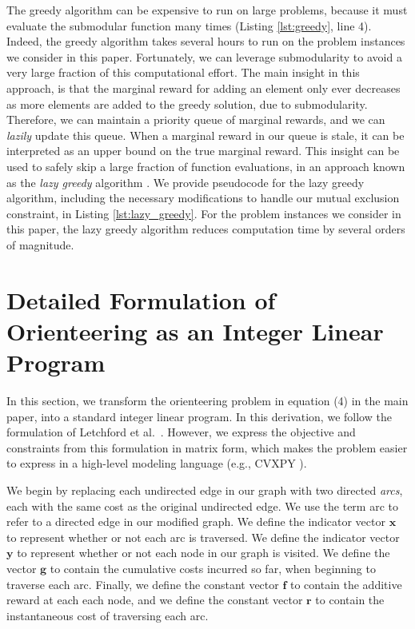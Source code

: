 The greedy algorithm can be expensive to run on large problems, because it must evaluate the submodular function many times (Listing \ref{lst:greedy}, line 4).
Indeed, the greedy algorithm takes several hours to run on the problem instances we consider in this paper. 
Fortunately, we can leverage submodularity to avoid a very large fraction of this computational effort.
The main insight in this approach, is that the marginal reward for adding an element only ever decreases as more elements are added to the greedy solution, due to submodularity.
Therefore, we can maintain a priority queue of marginal rewards, and we can \emph{lazily} update this queue.
When a marginal reward in our queue is stale, it can be interpreted as an upper bound on the true marginal reward. 
This insight can be used to safely skip a large fraction of function evaluations, in an approach known as the \emph{lazy greedy} algorithm \cite{krause:2014}.
We provide pseudocode for the lazy greedy algorithm, including the necessary modifications to handle our mutual exclusion constraint, in Listing \ref{lst:lazy_greedy}.
For the problem instances we consider in this paper, the lazy greedy algorithm reduces computation time by several orders of magnitude.

\vspace{0pt}
\section{Detailed Formulation of Orienteering as an Integer Linear Program}

In this section, we transform the orienteering problem in equation (4) in the main paper, into a standard integer linear program.
In this derivation, we follow the formulation of Letchford et al.~\cite{letchford:2013}.
However, we express the objective and constraints from this formulation in matrix form, which makes the problem easier to express in a high-level modeling language (e.g., CVXPY \cite{cvxpy:2016}).

We begin by replacing each undirected edge in our graph with two directed \emph{arcs}, each with the same cost as the original undirected edge.
We use the term arc to refer to a directed edge in our modified graph.
We define the indicator vector $\mathbf{x}$ to represent whether or not each arc is traversed.
We define the indicator vector $\mathbf{y}$ to represent whether or not each node in our graph is visited.
We define the vector $\mathbf{g}$ to contain the cumulative costs incurred so far, when beginning to traverse each arc.
Finally, we define the constant vector $\mathbf{f}$ to contain the additive reward at each each node, and we define the constant vector $\mathbf{r}$ to contain the instantaneous cost of traversing each arc.

